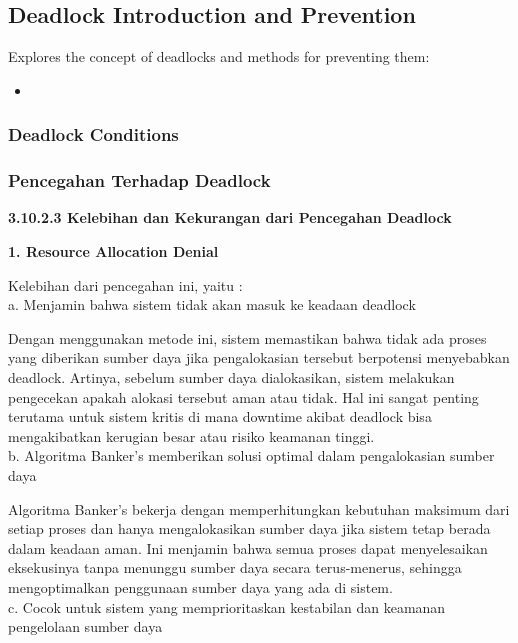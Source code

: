\documentclass[12pt]{article}
\begin{document}
\subsection{Deadlock Introduction and Prevention}

Explores the concept of deadlocks and methods for preventing them:
\begin{itemize}
    \item[]
\end{itemize}

\subsubsection{Deadlock Conditions}

\subsubsection{Pencegahan Terhadap Deadlock}
\textbf{3.10.2.3   Kelebihan dan Kekurangan dari Pencegahan Deadlock\\}

\textbf{1. Resource Allocation Denial\\}

    Kelebihan dari pencegahan ini, yaitu :\\

    a.	Menjamin bahwa sistem tidak akan masuk ke keadaan deadlock

    Dengan menggunakan metode ini, sistem memastikan bahwa tidak ada proses yang diberikan sumber daya jika pengalokasian tersebut berpotensi menyebabkan deadlock. Artinya, sebelum sumber daya dialokasikan, sistem melakukan pengecekan apakah alokasi tersebut aman atau tidak. Hal ini sangat penting terutama untuk sistem kritis di mana downtime akibat deadlock bisa mengakibatkan kerugian besar atau risiko keamanan tinggi.\\

    b.	Algoritma Banker's memberikan solusi optimal dalam pengalokasian sumber daya
    
    Algoritma Banker's bekerja dengan memperhitungkan kebutuhan maksimum dari setiap proses dan hanya mengalokasikan sumber daya jika sistem tetap berada dalam keadaan aman. Ini menjamin bahwa semua proses dapat menyelesaikan eksekusinya tanpa menunggu sumber daya secara terus-menerus, sehingga mengoptimalkan penggunaan sumber daya yang ada di sistem.\\

    c.	Cocok untuk sistem yang memprioritaskan kestabilan dan keamanan pengelolaan sumber daya
    
\end{document}
